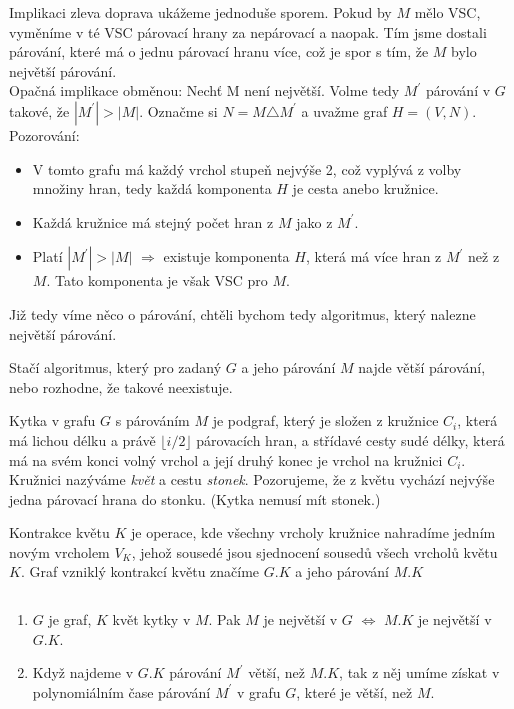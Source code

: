 \begin{t_proof}
  Implikaci zleva doprava ukážeme jednoduše sporem. Pokud by $M$ mělo VSC, vyměníme v té VSC párovací hrany za nepárovací a naopak. Tím jsme dostali párování, které má o jednu párovací hranu více, což je spor s tím, že $M$ bylo největší párování. \\
  Opačná implikace obměnou: Nechť M není největší. Volme tedy $M^\prime$ párování v $G$ takové, že $|M^\prime| > |M|$. Označme si $N = M \triangle M^\prime$ a uvažme graf $H=(V,N)$. Pozorování: 
  \begin{itemize}
    \item V tomto grafu má každý vrchol stupeň nejvýše 2, což vyplývá z volby množiny hran, tedy každá komponenta $H$ je cesta anebo kružnice. 
    \item Každá kružnice má stejný počet hran z $M$ jako z $M^\prime$. 
    \item Platí $|M^\prime| > |M|$ $\Rightarrow$ existuje komponenta $H$, která má více hran z $M^\prime$ než z $M$. Tato komponenta je však VSC pro $M$.
  \end{itemize}
\end{t_proof}
  Již tedy víme něco o párování, chtěli bychom tedy algoritmus, který nalezne největší párování.
  
\begin{t_observation}
  Stačí algoritmus, který pro zadaný $G$ a jeho párování $M$ najde větší párování, nebo rozhodne, že takové neexistuje.
\end{t_observation}

\begin{t_definition}
  Kytka v grafu $G$ s párováním $M$ je podgraf, který je složen z kružnice $C_i$, která má lichou délku a právě $\lfloor i/2 \rfloor$ párovacích hran, a střídavé cesty sudé délky, která má na svém konci volný vrchol a její druhý konec je vrchol na kružnici $C_i$. Kružnici nazýváme \textit{květ} a cestu \textit{stonek}. Pozorujeme, že z květu vychází nejvýše jedna párovací hrana do stonku. (Kytka nemusí mít stonek.)
\end{t_definition}

\begin{t_definition}
  Kontrakce květu $K$ je operace, kde všechny vrcholy kružnice nahradíme jedním novým vrcholem $V_K$, jehož sousedé jsou sjednocení sousedů všech vrcholů květu $K$. Graf vzniklý kontrakcí květu značíme $G.K$ a jeho párování $M.K$
\end{t_definition}

\begin{t_lemma}$ $
  \begin{enumerate}
    \item $G$ je graf, $K$ květ kytky v $M$. Pak $M$ je největší v $G$ $\iff$ $M.K$ je největší v $G.K$.
    \item Když najdeme v $G.K$ párování $M^\prime$ větší, než $M.K$, tak z něj umíme získat v polynomiálním čase párování $M^\prime$ v grafu $G$, které je větší, než $M$.
  \end{enumerate}
\end{t_lemma}

